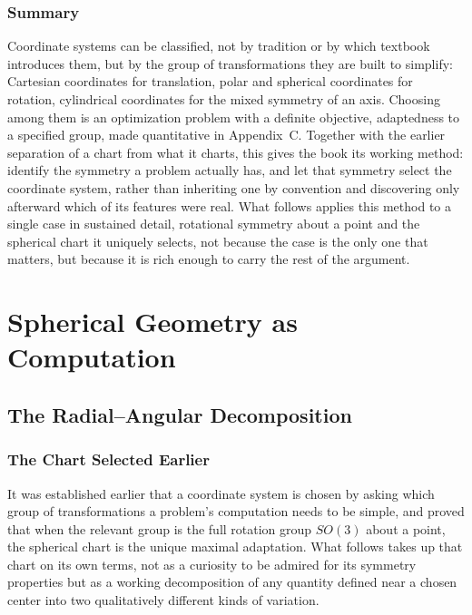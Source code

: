 \documentclass[11pt,fleqn]{book}
\numberwithin{equation}{chapter}
\theoremstyle{plain}
\theoremstyle{definition}
\theoremstyle{remark}
\begin{document}
\section{Summary}

Coordinate systems can be classified, not by tradition or by which textbook introduces them, but by the group of transformations they are built to simplify: Cartesian coordinates for translation, polar and spherical coordinates for rotation, cylindrical coordinates for the mixed symmetry of an axis. Choosing among them is an optimization problem with a definite objective, adaptedness to a specified group, made quantitative in Appendix~C. Together with the earlier separation of a chart from what it charts, this gives the book its working method: identify the symmetry a problem actually has, and let that symmetry select the coordinate system, rather than inheriting one by convention and discovering only afterward which of its features were real. What follows applies this method to a single case in sustained detail, rotational symmetry about a point and the spherical chart it uniquely selects, not because the case is the only one that matters, but because it is rich enough to carry the rest of the argument.


\part{Spherical Geometry as Computation}


\chapter{The Radial--Angular Decomposition}

\section{The Chart Selected Earlier}

It was established earlier that a coordinate system is chosen by asking which group of transformations a problem's computation needs to be simple, and proved that when the relevant group is the full rotation group \(SO(3)\) about a point, the spherical chart is the unique maximal adaptation. What follows takes up that chart on its own terms, not as a curiosity to be admired for its symmetry properties but as a working decomposition of any quantity defined near a chosen center into two qualitatively different kinds of variation.
\end{document}
